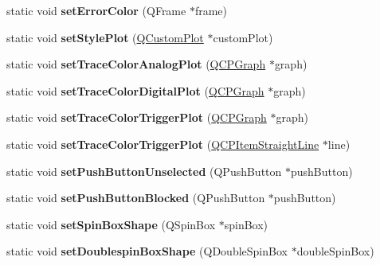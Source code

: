 \begin{DoxyCompactItemize}
static void {\bfseries set\+Error\+Color} (Q\+Frame $\ast$frame)
\item 
\mbox{\label{class_common_style_a5daa568d980818f27debd09563e5b09a}} 
static void {\bfseries set\+Style\+Plot} (\hyperlink{class_q_custom_plot}{Q\+Custom\+Plot} $\ast$custom\+Plot)
\item 
\mbox{\label{class_common_style_a8ecec34235d994eb4820bce580b76f8c}} 
static void {\bfseries set\+Trace\+Color\+Analog\+Plot} (\hyperlink{class_q_c_p_graph}{Q\+C\+P\+Graph} $\ast$graph)
\item 
\mbox{\label{class_common_style_a414e45087532995026e8f3600592ddc6}} 
static void {\bfseries set\+Trace\+Color\+Digital\+Plot} (\hyperlink{class_q_c_p_graph}{Q\+C\+P\+Graph} $\ast$graph)
\item 
\mbox{\label{class_common_style_adf7e29d5d52580a4fce9d5f087022867}} 
static void {\bfseries set\+Trace\+Color\+Trigger\+Plot} (\hyperlink{class_q_c_p_graph}{Q\+C\+P\+Graph} $\ast$graph)
\item 
\mbox{\label{class_common_style_a022b05dc96c44b2f4ee6a37e5107755d}} 
static void {\bfseries set\+Trace\+Color\+Trigger\+Plot} (\hyperlink{class_q_c_p_item_straight_line}{Q\+C\+P\+Item\+Straight\+Line} $\ast$line)
\item 
\mbox{\label{class_common_style_a16fa828b3b5982ae6869e74c7d6c2425}} 
static void {\bfseries set\+Push\+Button\+Unselected} (Q\+Push\+Button $\ast$push\+Button)
\item 
\mbox{\label{class_common_style_a8a5d61e9e7fefbe09a98f27be36922bb}} 
static void {\bfseries set\+Push\+Button\+Blocked} (Q\+Push\+Button $\ast$push\+Button)
\item 
\mbox{\label{class_common_style_ae8759be34cc2c780e28ecf1bb65500ae}} 
static void {\bfseries set\+Spin\+Box\+Shape} (Q\+Spin\+Box $\ast$spin\+Box)
\item 
\mbox{\label{class_common_style_aca4cb359b149af387324c1283e998fad}} 
static void {\bfseries set\+Doublespin\+Box\+Shape} (Q\+Double\+Spin\+Box $\ast$double\+Spin\+Box)

\end{DoxyCompactItemize}
